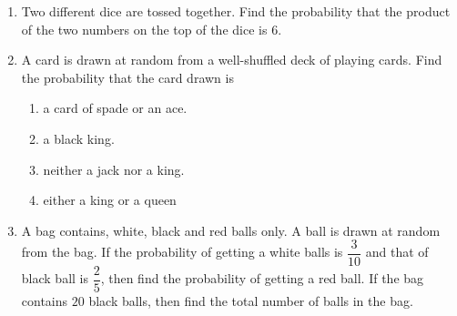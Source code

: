 \begin{enumerate}
\item Two different dice are tossed together. Find the probability that the product of the two numbers on the top of the dice is $6$.
\item A card is drawn at random from a well-shuffled deck of playing cards. Find the probability that the card drawn is
 \begin{enumerate}
     \item a card of spade or an ace.
     \item a black king. 
     \item neither a jack nor a king.
     \item either a king or a queen
 \end{enumerate}
\item A bag contains, white, black and red balls only. A ball is drawn at random from the bag. If the probability of getting a white balls is $\dfrac{3}{10}$ and that of black ball is $\dfrac{2}{5}$, then find the probability of getting a red ball. If the bag contains $20$ black balls, then find the total number of balls in the bag.
\end{enumerate}
